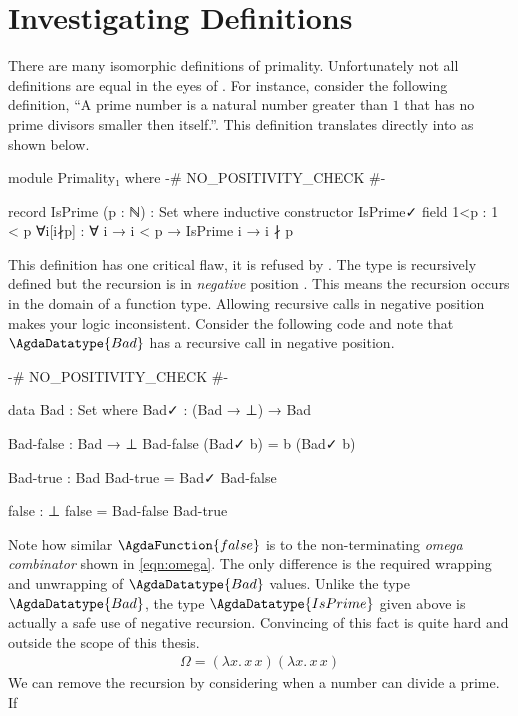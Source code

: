 \documentclass[./Thesis.tex]{subfiles}
\begin{document}
\section{Investigating Definitions}
\label{sec:investigating-definitions}
There are many isomorphic definitions of primality. Unfortunately not all
definitions are equal in the eyes of \Agda{}. For instance, consider the
following definition, ``A prime number is a natural number greater than $1$ that
has no prime divisors smaller then itself.''. This definition translates
directly into \Agda{} as shown below.
\begin{code}[hide]
  module Primality₁ where
    {-# NO_POSITIVITY_CHECK #-}
\end{code}
\begin{code}
    record IsPrime (p : ℕ) : Set where
      inductive
      constructor IsPrime✓
      field
        1<p : 1 < p
        ∀i[i∤p] : ∀ {i} → i < p → IsPrime i → i ∤ p
\end{code}
This definition has one critical flaw, it is refused by \Agda{}. The type is
recursively defined but the recursion is in \textit{negative} position
\cite{harper}. This means the recursion occurs in the domain of a function type.
Allowing recursive calls in negative position makes your logic inconsistent.
Consider the following code and note that $\AgdaDatatype{Bad}$ has a recursive
call in negative position.
\begin{code}[hide]
  {-# NO_POSITIVITY_CHECK #-}
\end{code}
\begin{code}
  data Bad : Set where
    Bad✓ : (Bad → ⊥) → Bad

  Bad-false : Bad → ⊥
  Bad-false (Bad✓ b) = b (Bad✓ b)

  Bad-true : Bad
  Bad-true = Bad✓ Bad-false

  false : ⊥
  false = Bad-false Bad-true
\end{code}
Note how similar $\AgdaFunction{false}$ is to the non-terminating
\textit{omega combinator} shown in \ref{eqn:omega}. The only difference is the required
wrapping and unwrapping of $\AgdaDatatype{Bad}$ values. Unlike the type
$\AgdaDatatype{Bad}$, the type $\AgdaDatatype{IsPrime}$ given above is actually a safe
use of negative recursion. Convincing \Agda{} of this fact is quite hard and
outside the scope of this thesis.
\begin{align}
  \label{eqn:omega}
  \Omega = (\lambda x. \, x \, x) (\lambda x. \, x \, x)
\end{align}
We can remove the recursion by considering when a number can divide a prime. If
\end{document}
